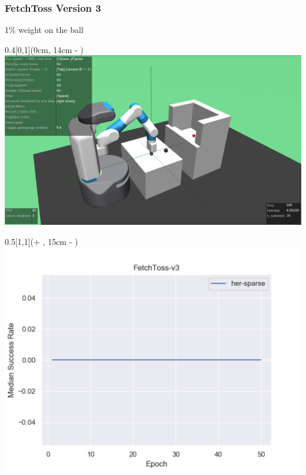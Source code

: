 


\begin{frame}
	\frametitle{FetchToss Version 3}	
	\vspace{1cm}
	
	1\% weight on the ball
	
	\begin{textblock*}{0.4\paperwidth}[0,1](0cm, 14cm - \PraesentationSeitenrand)%
		\includegraphics[width=0.4\paperwidth]{./Ressourcen/Figures/FetchToss-v3.pdf}
	\end{textblock*}
	
	\begin{textblock*}{0.5\paperwidth}[1,1](\textwidth + \PraesentationSeitenrand, 15cm - \PraesentationSeitenrand)%
		\includegraphics[width=0.5\paperwidth]{./Ressourcen/Figures/fig_FetchToss-v3.pdf}
	\end{textblock*}
	
	
\end{frame}
\clearpage

